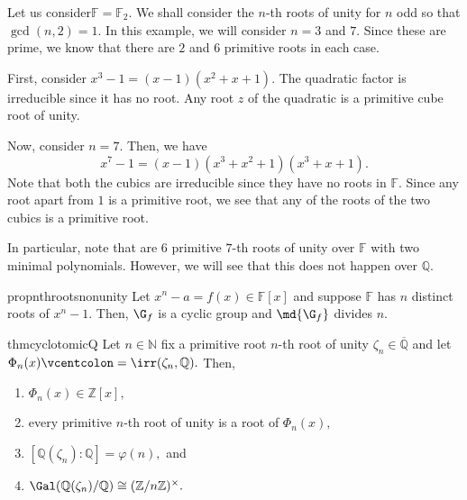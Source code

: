 \begin{ex} \label{ex:irrunityFtwo}
    Let us consider$\mathbb{F} = \mathbb{F}_2.$ We shall consider the $n$-th roots of unity for $n$ odd so that $\gcd(n, 2) = 1.$ In this example, we will consider $n = 3$ and $7.$ Since these are prime, we know that there are $2$ and $6$ primitive roots in each case.

    First, consider $x^3 - 1 = (x - 1)(x^2 + x + 1).$ The quadratic factor is irreducible since it has no root. Any root $z$ of the quadratic is a primitive cube root of unity.

    Now, consider $n = 7.$ Then, we have
    \begin{equation*} 
        x^7 - 1 = (x - 1)(x^3 + x^2 + 1)(x^3 + x + 1).
    \end{equation*}
    Note that both the cubics are irreducible since they have no roots in $\mathbb{F}.$ Since any root apart from $1$ is a primitive root, we see that any of the roots of the two cubics is a primitive root. 

    In particular, note that are $6$ primitive $7$-th roots of unity over $\mathbb{F}$ with two minimal polynomials. However, we will see that this does not happen over $\mathbb{Q}.$
\end{ex}

\begin{restatable}[]{prop}{nthrootsnonunity}
\label{prop:nthrootsnonunity}
    Let $x^n - a = f(x) \in \mathbb{F}[x]$ and suppose $\mathbb{F}$ has $n$ distinct roots of $x^n - 1.$ Then, $\G_f$ is a cyclic group and $\md{\G_f}$ divides $n.$ \hfill\hyperref[prop:nthrootsnonunity2]{\downsym}
\end{restatable}

\begin{restatable}[]{thm}{cyclotomicQ}
\label{thm:cyclotomicQ}
    Let $n \in \mathbb{N}$ fix a primitive root $n$-th root of unity $\zeta_n \in \overline{\mathbb{Q}}$ and let $\Phi_n(x) \vcentcolon= \irr(\zeta_n, \mathbb{Q}).$ Then,
    \begin{enumerate}
         \item $\Phi_n(x) \in \mathbb{Z}[x],$
         \item every primitive $n$-th root of unity is a root of $\Phi_n(x),$
         \item $[\mathbb{Q}(\zeta_n) : \mathbb{Q}] = \varphi(n),$ and
         \item $\Gal(\mathbb{Q}(\zeta_n)/\mathbb{Q}) \cong (\mathbb{Z}/n\mathbb{Z})^\times.$ \hfill\hyperref[thm:cyclotomicQ2]{\downsym}
     \end{enumerate} 
\end{restatable}

